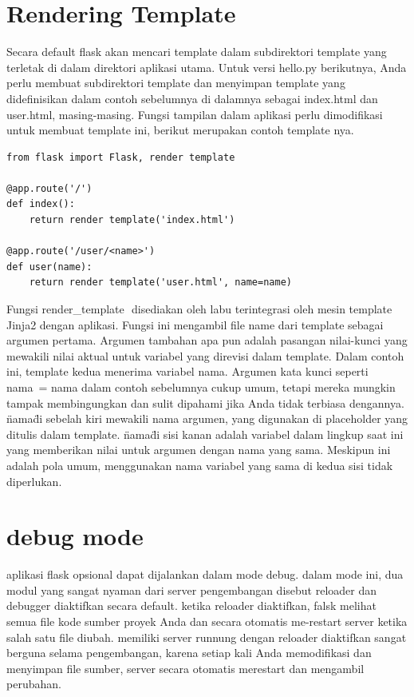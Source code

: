 \section{Rendering Template}
Secara default flask akan mencari template dalam subdirektori template yang terletak di dalam direktori aplikasi utama. Untuk versi hello.py berikutnya, Anda perlu membuat subdirektori template dan menyimpan template yang didefinisikan dalam contoh sebelumnya di dalamnya sebagai index.html dan user.html, masing-masing. 
Fungsi tampilan dalam aplikasi perlu dimodifikasi untuk membuat template ini, berikut merupakan contoh template nya.
\begin{verbatim}
from flask import Flask, render template

@app.route('/')
def index():
    return render template('index.html')

@app.route('/user/<name>')
def user(name):
    return render template('user.html', name=name)
\end{verbatim}

Fungsi render\_template \(\) disediakan oleh labu terintegrasi oleh mesin template Jinja2 dengan aplikasi. Fungsi ini mengambil file name dari template sebagai argumen pertama. Argumen tambahan apa pun adalah pasangan nilai-kunci yang mewakili nilai aktual untuk variabel yang direvisi dalam template. 
Dalam contoh ini, template kedua menerima variabel nama. Argumen kata kunci seperti nama\ = nama dalam contoh sebelumnya cukup umum, tetapi mereka mungkin tampak membingungkan dan sulit dipahami jika Anda tidak terbiasa dengannya. \"nama\" di sebelah kiri mewakili nama argumen, yang digunakan di placeholder yang ditulis dalam template. \"nama\" di sisi kanan adalah variabel dalam lingkup saat ini yang memberikan nilai untuk argumen dengan nama yang sama. Meskipun ini adalah pola umum, menggunakan nama variabel yang sama di kedua sisi tidak diperlukan. 

\section{debug mode}
aplikasi flask opsional dapat dijalankan dalam mode debug. dalam mode ini, dua modul yang sangat nyaman dari server pengembangan disebut 
reloader dan debugger diaktifkan secara default. ketika reloader diaktifkan, falsk melihat semua file kode sumber proyek Anda dan secara 
otomatis me-restart server ketika salah satu file diubah. memiliki server runnung dengan reloader diaktifkan sangat berguna selama 
pengembangan, karena setiap kali Anda memodifikasi dan menyimpan file sumber, server secara otomatis merestart dan mengambil perubahan.

